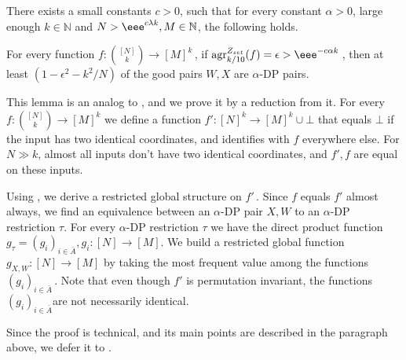 \documentclass{toc}
\newcommand\f{f} %
\newcommand\setf{f} %
\newcommand{\g}{g} %
\newcommand{\test}[2]{
	\ifx &#2&
	\textrm{agr}^{#1}
	\else	
	\textrm{agr}^{#1}_{#2}
	\fi}
\newcommand{\sets}{\binom{[N]}{k}} %
\newcommand\rest[1]{{\bar{#1}}}  %
\begin{document}
\begin{lemma}\label{lem:local structure for sets}
	There exists a small constants $c>0$, such that for every constant $\alpha>0$, large enough $k\in\mathbb{N}$ and $N > \eee^{c\lambda k},M\in\mathbb{N}$, the following holds.
	
	For every function  $\setf:\sets\rightarrow[M]^k$\,, if $\test{Z_{set}}{k/10}(\setf)=\epsilon > \eee^{-c\alpha k}$\,, then  at least $(1-\epsilon^2-
	k^2/N%
	)$ of the good pairs $W,X$ are $\alpha$-DP pairs.
\end{lemma}
This lemma is an analog to , and we prove it by a reduction from it. For every $\f:\sets\rightarrow[M]^k$ we define a function $\f':[N]^k\rightarrow[M]^k\cup \bot$ that equals $\bot$ if the input has two identical coordinates, and identifies with $\setf$ everywhere else. For $N\gg k$, almost all inputs don't have two identical coordinates, and $\f',\setf$ are equal on these inputs.

Using , we derive a restricted global structure on $\f'$\,. Since $\setf$ equals $\f'$ almost always, we find an equivalence between an $\alpha$-DP pair $X,W$ to an $\alpha$-DP restriction $\tau$. For every $\alpha$-DP restriction $\tau$ we have the direct product function $\g_\tau=(\g_i)_{i\in\rest{A}}, \g_i:[N]\rightarrow[M]$. We build a restricted global function $\g_{X,W}:[N]\rightarrow[M]$ by taking the most frequent value among the functions $(\g_i)_{i\in\rest{A}}$\,. Note that even though $\f'$ is permutation invariant, the functions $(\g_i)_{i\in\rest{A}}$are not necessarily identical.

Since the proof is technical, and its main points are described in the paragraph above, we defer it to .
\end{document}
